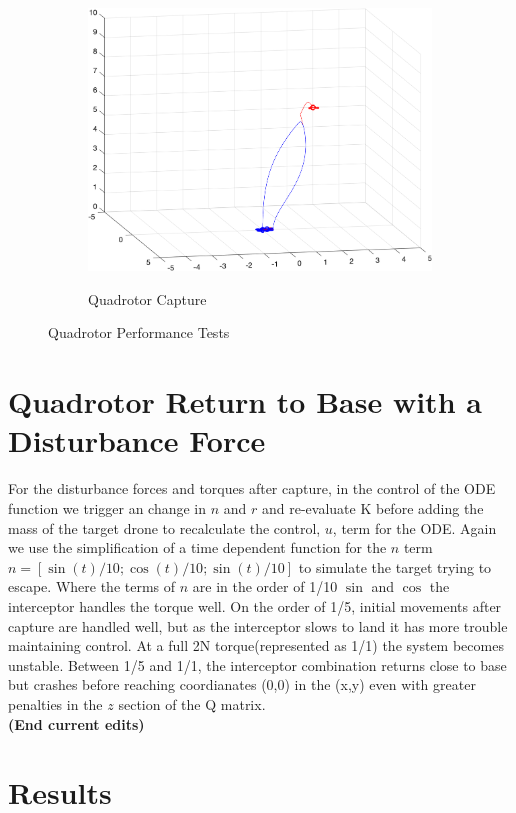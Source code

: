 \documentclass{article}
\begin{document}
\begin{figure}[H]
\begin{subfigure}[b]{0.31\textwidth}
    \includegraphics[width = 1\textwidth]{images/Intercept.png}
     \label{fig:Capture}
     \caption{Quadrotor Capture}
 \end{subfigure}
   \caption{Quadrotor Performance Tests}
\end{figure}

\bigskip
\section*{Quadrotor Return to Base with a Disturbance Force}
For the disturbance forces and torques after capture,  in the control of the ODE function we trigger an change in $n$ and $r$ and re-evaluate K before adding the mass of the target drone to recalculate the control, $u$, term for the ODE.  Again we use the simplification of a time dependent function for the $n$ term $n=[\sin(t)/10; \cos(t)/10; \sin(t)/10]$ to simulate the target trying to escape.  Where the terms of $n$ are in the order of 1/10 $\sin$ and $\cos$ the interceptor handles the torque well.  On the order of 1/5, initial movements after capture are handled well, but as the interceptor slows to land it has more trouble maintaining control.  At a full 2N torque(represented as 1/1) the system becomes unstable. Between 1/5 and 1/1, the interceptor combination returns close to base but crashes before reaching coordianates (0,0) in the (x,y) even with greater penalties in the $z$ section of the Q matrix.\\
  
\textbf{(End current edits)}
\section*{Results}
\end{document}
